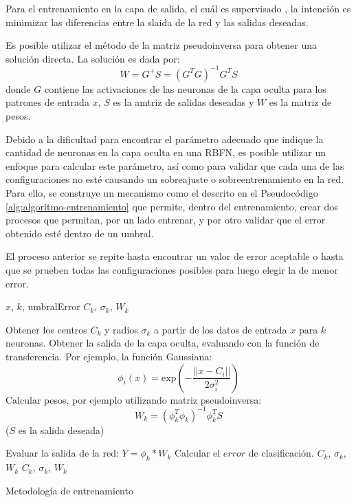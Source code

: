 \documentclass[journal]{IEEEtran}
\begin{document}
Para el entrenamiento en la capa de salida, el cuál es supervisado , la intención es minimizar las diferencias entre la slaida de la red y las salidas deseadas.

Es posible utilizar el método de la matriz pseudoinversa para obtener una solución directa.
La solución es dada por:
$$
W = G^{+}S = (G^T G)^{-1}G^T S
$$
donde $G$ contiene las activaciones de las neuronas de la capa oculta para los patrones de entrada $x$, $S$ es la amtriz de salidas deseadas y $W$ es la matriz de pesos.

Debido a la dificultad para encontrar el parámetro adecuado que indique la cantidad de neuronas en la capa oculta en una RBFN, es posible utilizar un enfoque para calcular este parámetro, así como para validar que cada una de las configuraciones no esté causando un sobreajuste o sobreentrenamiento en la red.
Para ello, se construye un mecanismo como el descrito en el Pseudocódigo \ref{alg:algoritmo-entrenamiento} que permite, dentro del entrenamiento, crear dos procesos que permitan, por un lado entrenar, y por otro validar que el error obtenido esté dentro de un umbral.

El proceso anterior se repite hasta encontrar un valor de error aceptable o hasta que se prueben todas las configuraciones posibles para luego elegir la de menor error.

\begin{algorithm} 
\footnotesize
\begin{algorithmic}[1] 
\REQUIRE  $x$, $k$, umbralError
\ENSURE $C_k$, $\sigma _k$, $W_k$

\REPEAT
\STATE Obtener los centros $C_k$ y radios $\sigma _k$ a partir de los datos de entrada $x$ para $k$ neuronas.
\STATE Obtener la salida de la capa oculta, evaluando con la función de transferencia. 
Por ejemplo, la función Gaussiana:
$$
\phi_i (x) = \text{exp}(-\frac{||x-C_i||}{2\sigma_i^2})
$$
\STATE Calcular pesos, por ejemplo utilizando matriz pseudoinversa:
$$
W_k = (\phi _k^T \phi _k)^{-1} \phi _k^T S
$$
($S$ es la salida deseada)

\STATE Evaluar la salida de la red: $Y = \phi _k * W_k$
\STATE Calcular el $error$ de clasificación.
	\RETURN $C_k$, $\sigma _k$, $W_k$
\ENDIF
{}
\RETURN $C_k$, $\sigma _k$, $W_k$
\end{algorithmic} 
\caption{Metodología de entrenamiento} 
\label{alg:algoritmo-entrenamiento}
\end{algorithm}
\end{document}

